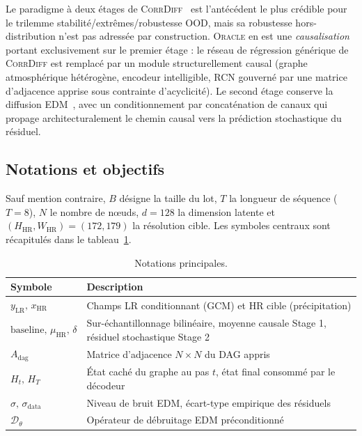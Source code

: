 \documentclass[14pt,a4paper,openany]{extreport}
\theoremstyle{definition}
\newcommand{\Oracle}{\textsc{Oracle}}
\newcommand{\CorrDiff}{\textsc{CorrDiff}}
\newcommand{\LR}{\ensuremath{\text{LR}}}
\newcommand{\HR}{\ensuremath{\text{HR}}}
\newcommand{\xHR}{\ensuremath{x_{\HR}}}
\newcommand{\yLR}{\ensuremath{y_{\LR}}}
\newcommand{\muHR}{\ensuremath{\mu_{\HR}}}
\newcommand{\Adag}{\ensuremath{A_{\mathrm{dag}}}}
\newcommand{\Ht}{\ensuremath{H_t}}
\newcommand{\HT}{\ensuremath{H_T}}
\begin{document}
Le paradigme à deux étages de \CorrDiff{}~\cite{mardani_corrdiff_2023} est l'antécédent le plus crédible pour le trilemme stabilité/extrêmes/robustesse OOD, mais sa robustesse hors-distribution n'est pas adressée par construction. \Oracle{} en est une \emph{causalisation} portant exclusivement sur le premier étage : le réseau de régression générique de \CorrDiff{} est remplacé par un module structurellement causal (graphe atmosphérique hétérogène, encodeur intelligible, RCN gouverné par une matrice d'adjacence apprise sous contrainte d'acyclicité). Le second étage conserve la diffusion EDM~\cite{karras_edm_2022}, avec un conditionnement par concaténation de canaux qui propage architecturalement le chemin causal vers la prédiction stochastique du résiduel.

\subsection{Notations et objectifs}
\label{ssec:oracle-notations}

Sauf mention contraire, $B$ désigne la taille du lot, $T$ la longueur de séquence ($T=8$), $N$ le nombre de nœuds, $d=128$ la dimension latente et $(H_{\HR}, W_{\HR})=(172,179)$ la résolution cible. Les symboles centraux sont récapitulés dans le tableau~\ref{tab:notations}.

\begin{table}[ht]
  \centering
  \small
  \caption{Notations principales.}
  \label{tab:notations}
  \begin{tabularx}{\linewidth}{l X}
    \toprule
    \textbf{Symbole} & \textbf{Description} \\
    \midrule
    $\yLR,\,\xHR$ & Champs LR conditionnant (GCM) et HR cible (précipitation) \\
    $\mathrm{baseline},\,\muHR,\,\delta$ & Sur-échantillonnage bilinéaire, moyenne causale Stage 1, résiduel stochastique Stage 2 \\
    $\Adag$ & Matrice d'adjacence $N\times N$ du DAG appris \\
    $\Ht,\,\HT$ & État caché du graphe au pas $t$, état final consommé par le décodeur \\
    $\sigma,\,\sigma_{\mathrm{data}}$ & Niveau de bruit EDM, écart-type empirique des résiduels \\
    $\mathcal{D}_\theta$ & Opérateur de débruitage EDM préconditionné \\
    \bottomrule
  \end{tabularx}
\end{table}
\end{document}
